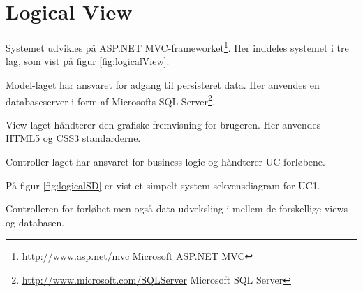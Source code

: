 \section{Logical View}\label{sec:LogicalView}
Systemet udvikles på ASP.NET MVC-frameworket\footnote{\url{http://www.asp.net/mvc} Microsoft ASP.NET MVC}. Her inddeles systemet i tre lag, som vist på figur \ref{fig:logicalView}.


Model-laget har ansvaret for adgang til persisteret data. Her anvendes en databaseserver i form af Microsofts SQL Server\footnote{\url{http://www.microsoft.com/SQLServer} Microsoft SQL Server}.

View-laget håndterer den grafiske fremvisning for brugeren. Her anvendes HTML5 og CSS3 standarderne.

Controller-laget har ansvaret for business logic og håndterer UC-forløbene.

På figur \ref{fig:logicalSD} er vist et simpelt system-sekvensdiagram for UC1.


Controlleren for forløbet men også data udveksling i mellem de forskellige views og databasen.
